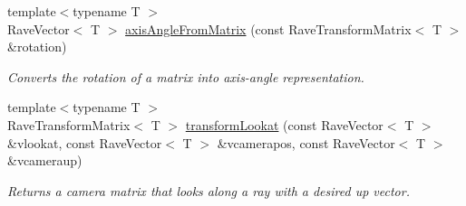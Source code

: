 \begin{DoxyCompactItemize}
{\footnotesize template$<$typename T $>$ }\\RaveVector$<$ T $>$ \hyperlink{group__affine__math_gabf46823a4c5b59c9ac3e72f0905bea24}{axisAngleFromMatrix} (const RaveTransformMatrix$<$ T $>$ \&rotation)
\begin{DoxyCompactList}\small\item\em Converts the rotation of a matrix into axis-\/angle representation. \item\end{DoxyCompactList}\item 
{\footnotesize template$<$typename T $>$ }\\RaveTransformMatrix$<$ T $>$ \hyperlink{group__affine__math_ga9db1071fa2f5264616dabb3b3d16eec9}{transformLookat} (const RaveVector$<$ T $>$ \&vlookat, const RaveVector$<$ T $>$ \&vcamerapos, const RaveVector$<$ T $>$ \&vcameraup)
\begin{DoxyCompactList}\small\item\em Returns a camera matrix that looks along a ray with a desired up vector. \item\end{DoxyCompactList}\end{DoxyCompactItemize}
\label{_amgrpd41d8cd98f00b204e9800998ecf8427e}
